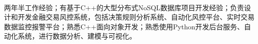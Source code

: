 \documentclass[11pt, a4paper, UTF8]{awesome-cv}
\begin{document}
\makecvheader[R]

\makecvfooter
  {\ }
  {\ }
  {\thepage}




\begin{cvparagraph}
两年半工作经验；有基于C++的大型分布式NoSQL数据库项目开发经验；负责设计和开发金融交易风控系统，包括决策规则分析系统、自动化风控平台、实时交易数据监控报警平台；熟悉C++面向对象开发；熟悉使用Python开发后台服务、自动化系统，进行数据分析、建模与可视化。
\end{cvparagraph}
\end{document}
